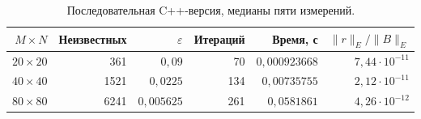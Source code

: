 \begin{table}[H]
\centering\small
\caption{Последовательная C++-версия, медианы пяти измерений.}
\begin{tabular}{rrrrrr}
\toprule
$M\times N$ & Неизвестных & $\varepsilon$ & Итераций & Время, с & $\|r\|_E/\|B\|_E$ \\
\midrule
$20\times20$ & 361 & $0{,}09$ & 70 & $0{,}000923668$ & $7{,}44\cdot10^{-11}$ \\
$40\times40$ & 1521 & $0{,}0225$ & 134 & $0{,}00735755$ & $2{,}12\cdot10^{-11}$ \\
$80\times80$ & 6241 & $0{,}005625$ & 261 & $0{,}0581861$ & $4{,}26\cdot10^{-12}$ \\
\bottomrule
\end{tabular}
\end{table}
